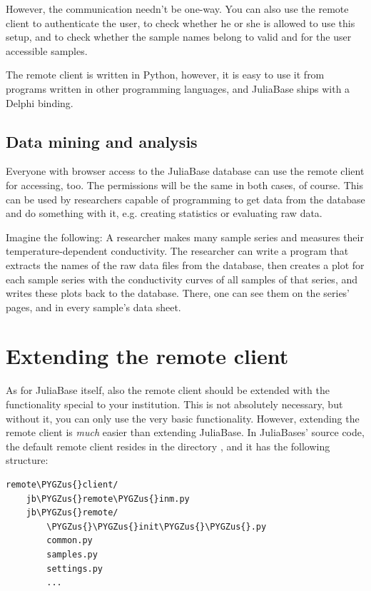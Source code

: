 \documentclass[a4paper,11pt,english]{sphinxmanual}
\def\PYGZus{\char`\_}
\begin{document}
However, the communication needn't be one-way.  You can also use the remote
client to authenticate the user, to check whether he or she is allowed to use
this setup, and to check whether the sample names belong to valid and for the
user accessible samples.

The remote client is written in Python, however, it is easy to use it from
programs written in other programming languages, and JuliaBase ships with a
Delphi binding.


\subsection{Data mining and analysis}
\label{programming/remote_client:data-mining-and-analysis}
Everyone with browser access to the JuliaBase database can use the remote
client for accessing, too.  The permissions will be the same in both cases, of
course.  This can be used by researchers capable of programming to get data
from the database and do something with it, e.g. creating statistics or
evaluating raw data.

Imagine the following: A researcher makes many sample series and measures their
temperature-dependent conductivity.  The researcher can write a program that
extracts the names of the raw data files from the database, then creates a plot
for each sample series with the conductivity curves of all samples of that
series, and writes these plots back to the database.  There, one can see them
on the series' pages, and in every sample's data sheet.


\section{Extending the remote client}
\label{programming/remote_client:extending-the-remote-client}
As for JuliaBase itself, also the remote client should be extended with the
functionality special to your institution.  This is not absolutely necessary,
but without it, you can only use the very basic functionality.  However,
extending the remote client is \emph{much} easier than extending JuliaBase.
\label{programming/remote_client:remote-client-file-list}
In JuliaBases' source code, the default remote client resides in the directory
, and it has the following structure:

\begin{Verbatim}[commandchars=\\\{\},formatcom=\scriptsize]
remote\PYGZus{}client/
    jb\PYGZus{}remote\PYGZus{}inm.py
    jb\PYGZus{}remote/
        \PYGZus{}\PYGZus{}init\PYGZus{}\PYGZus{}.py
        common.py
        samples.py
        settings.py
        ...
\end{Verbatim}
\end{document}

